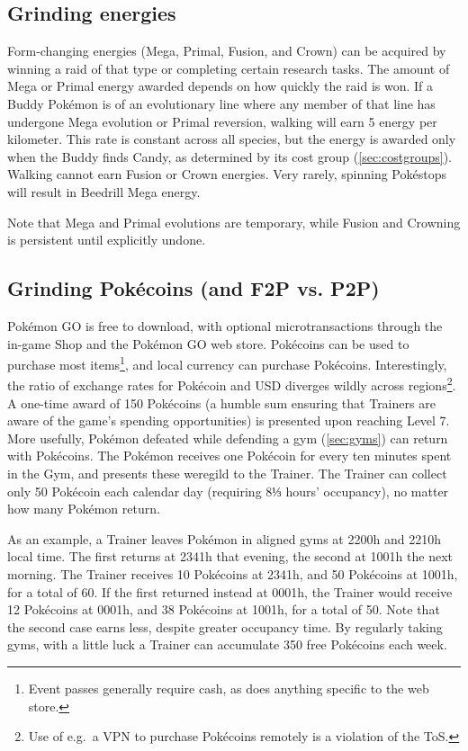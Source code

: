 \subsection{Grinding energies}
Form-changing energies (Mega, Primal, Fusion, and Crown) can be acquired by
 winning a raid of that type or completing certain research tasks.
The amount of Mega or Primal energy awarded depends on how quickly the raid is won.
If a Buddy Pokémon is of an evolutionary line where any member of that line has undergone Mega evolution
  or Primal reversion, walking will earn 5 energy per kilometer.
This rate is constant across all species, but the energy is awarded only when the Buddy finds Candy,
  as determined by its cost group (\autoref{sec:costgroups}).
Walking cannot earn Fusion or Crown energies.
Very rarely, spinning Pokéstops will result in Beedrill Mega energy.

Note that Mega and Primal evolutions are temporary, while Fusion and Crowning is persistent
  until explicitly undone.
\subsection{Grinding Pokécoins (and F2P vs. P2P)\label{subsec:getcoins}}
Pokémon GO is free to download, with optional microtransactions through the in-game
  Shop and the Pokémon GO web store.
Pokécoins can be used to purchase most items\footnote{Event passes generally require cash,
  as does anything specific to the web store.}, and local currency can purchase Pokécoins.
Interestingly, the ratio of exchange rates for Pokécoin and USD diverges
  wildly across regions\footnote{Use of e.g.\ a VPN to purchase Pokécoins remotely is a violation of the ToS\@.}.
A one-time award of 150 Pokécoins (a humble sum ensuring that Trainers are aware of the game's spending opportunities)
  is presented upon reaching Level 7.
More usefully, Pokémon defeated while defending a gym (\autoref{sec:gyms}) can
  return with Pokécoins.
The Pokémon receives one Pokécoin for every ten minutes spent in the Gym, and presents these weregild to the Trainer.
The Trainer can collect only 50 Pokécoin each calendar day (requiring 8⅓ hours' occupancy), no matter how many Pokémon return.

As an example, a Trainer leaves Pokémon in aligned gyms at 2200h and 2210h local time.
The first returns at 2341h that evening, the second at 1001h the next morning.
The Trainer receives 10 Pokécoins at 2341h, and 50 Pokécoins at 1001h, for a total of 60.
If the first returned instead at 0001h, the Trainer would receive 12 Pokécoins at 0001h,
  and 38 Pokécoins at 1001h, for a total of 50.
Note that the second case earns less, despite greater occupancy time.
By regularly taking gyms, with a little luck a Trainer can accumulate 350 free Pokécoins each week.

